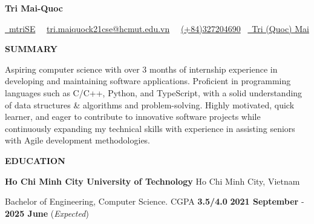 \documentclass[a4paper,10pt]{article}
\begin{document}
\begin{center}
    \textbf{\huge Tri Mai-Quoc}\\ 
\end{center}

\begin{center}
    \href{https://github.com/mtriSE}{\faGithub\ mtriSE} \textbullet \ \faEnvelope \ \href{mailto:tri.maiquock21cse@hcmut.edu.vn}{tri.maiquock21cse@hcmut.edu.vn} \textbullet \ \faPhone \ \href{tel:+84327204690}{(+84)327204690} \textbullet \     \href{https://www.linkedin.com/in/mqtri/}{\faLinkedinSquare \ Tri (Quoc) Mai}
\end{center}

\begin{center}
    \textbf{SUMMARY} \hrulefill
\end{center}
Aspiring computer science with over 3 months of internship experience in developing and maintaining software applications. Proficient in programming languages such as C/C++, Python, and TypeScript, with a solid understanding of data structures \& algorithms and problem-solving. Highly motivated, quick learner, and eager to contribute to innovative software projects while continuously expanding my technical skills with experience in assisting seniors with Agile development methodologies.

\vspace{10pt}

\begin{center}
    \textbf{EDUCATION} \hrulefill
\end{center}
\textbf{Ho Chi Minh City University of Technology} \hfill Ho Chi Minh City, Vietnam

Bachelor of Engineering, Computer Science. CGPA \textbf{3.5/4.0} \hfill \textbf{2021 September} - \textbf{2025 June} (\textit{Expected})

\end{document}
